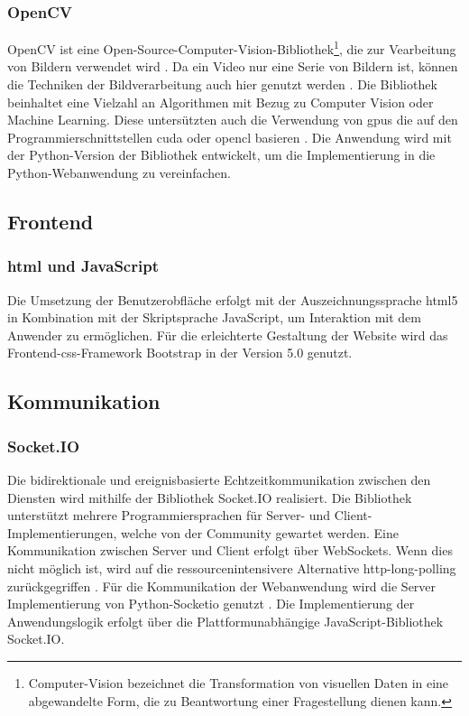 \subsubsection{OpenCV}
OpenCV ist eine Open-Source-Computer-Vision-Bibliothek\footnote{Computer-Vision bezeichnet die Transformation von visuellen Daten in eine abgewandelte Form, die zu Beantwortung einer Fragestellung dienen kann.}, die zur Vearbeitung von Bildern verwendet wird \cite{opencvintro}.
Da ein Video nur eine Serie von Bildern ist, können die Techniken der Bildverarbeitung auch hier genutzt werden \cite{ansari_core_2020}.
Die Bibliothek beinhaltet eine Vielzahl an Algorithmen mit Bezug zu Computer Vision oder Machine Learning.
Diese untersützten auch die Verwendung von \acp{gpu} die auf den Programmierschnittstellen \ac{cuda} oder \ac{opencl} basieren \cite{opencvpython}.
Die Anwendung wird mit der Python-Version der Bibliothek entwickelt, um die Implementierung in die Python-Webanwendung zu vereinfachen.



\subsection{Frontend}

\subsubsection{\ac{html} und JavaScript}
Die Umsetzung der Benutzerobfläche erfolgt mit der Auszeichnungssprache \acs{html}5 in Kombination
mit der Skriptsprache JavaScript, um Interaktion mit dem Anwender zu ermöglichen.
Für die erleichterte Gestaltung der Website wird das Frontend-\acs{css}-Framework Bootstrap in der Version 5.0 genutzt.

\subsection{Kommunikation}

\subsubsection{Socket.IO}
Die bidirektionale und ereignisbasierte Echtzeitkommunikation zwischen den Diensten wird mithilfe der Bibliothek Socket.IO realisiert.
Die Bibliothek unterstützt mehrere Programmiersprachen für Server- und Client-Implementierungen, welche von der Community gewartet werden.
Eine Kommunikation zwischen Server und Client erfolgt über WebSockets. 
Wenn dies nicht möglich ist, wird auf die ressourcenintensivere \cite{httpwebsocket} Alternative \acs{http}-long-polling zurückgegriffen \cite{socketio}.
Für die Kommunikation der Webanwendung wird die Server Implementierung von Python-Socketio genutzt \cite{python-socketio}.
Die Implementierung der Anwendungslogik erfolgt über die Plattformunabhängige JavaScript-Bibliothek Socket.IO.


